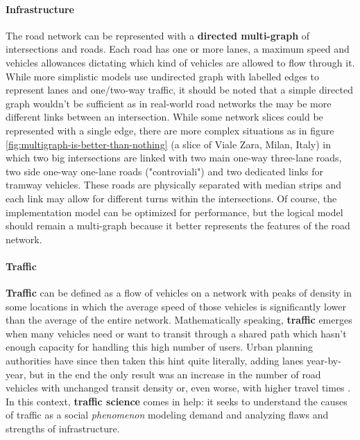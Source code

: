 \paragraph{Infrastructure}

The road network can be represented with a \textbf{directed multi-graph} of intersections and roads. Each road has one or more lanes, a maximum speed and vehicles allowances dictating which kind of vehicles are allowed to flow through it. While more simplistic models use undirected graph with labelled edges to represent lanes and one/two-way traffic, it should be noted that a simple directed graph wouldn't be sufficient as in real-world road networks the may be more different links between an intersection. While some network slices could be represented with a single edge, there are more complex situations as in figure \ref{fig:multigraph-is-better-than-nothing} (a slice of Viale Zara, Milan, Italy) in which two big intersections are linked with two main one-way three-lane roads, two side one-way one-lane roads ("controviali") and two dedicated links for tramway vehicles. These roads are physically separated with median strips and each link may allow for different turns within the intersections. Of course, the implementation model can be optimized for performance, but the logical model should remain a multi-graph because it better represents the features of the road network.


\paragraph{Traffic}

\textbf{Traffic} can be defined as a flow of vehicles on a network with peaks of density in some locations in which the average speed of those vehicles is significantly lower than the average of the entire network.
Mathematically speaking, \textbf{traffic} emerges when many vehicles need or want to transit through a shared path which hasn't enough capacity for handling this high number of users.
Urban planning authorities have since then taken this hint quite literally, adding lanes year-by-year, but in the end the only result was an increase in the number of road vehicles with unchanged transit density or, even worse, with higher travel times \cite{Speck2018}.
In this context, \textbf{traffic science} comes in help: it seeks to understand the causes of traffic as a social \textit{phenomenon} modeling demand and analyzing flaws and strengths of infrastructure.


